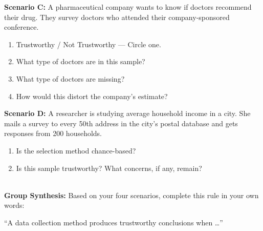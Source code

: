 \documentclass[10pt]{article}
\begin{document}
\vspace{0.1in}

\textbf{Scenario C:} A pharmaceutical company wants to know if doctors recommend their
drug. They survey doctors who attended their company-sponsored conference.

\begin{practicebox}
\small
\begin{enumerate}[leftmargin=1.5em, itemsep=8pt]
  \item Trustworthy \quad / \quad Not Trustworthy --- Circle one.
  \item What type of doctors are in this sample? \blank{8cm}
  \item What type of doctors are missing? \blank{8cm}
  \item How would this distort the company's estimate? \blank{8cm}
\end{enumerate}
\end{practicebox}

\vspace{0.1in}

\textbf{Scenario D:} A researcher is studying average household income in a city.
She mails a survey to every 50th address in the city's postal database and
gets responses from 200 households.

\begin{practicebox}
\small
\begin{enumerate}[leftmargin=1.5em, itemsep=8pt]
  \item Is the selection method chance-based? \blank{5cm}
  \item Is this sample trustworthy? What concerns, if any, remain?\\
        \writeline\\[1pt]\writeline
\end{enumerate}
\end{practicebox}

\vspace{0.12in}

\begin{practicebox}
\small
\textbf{Group Synthesis:} Based on your four scenarios, complete this rule in your
own words:

\vspace{6pt}
``A data collection method produces trustworthy conclusions when \ldots''\\[6pt]
\writeline\\[1pt]\writeline\\[1pt]\writeline
\end{practicebox}
\end{document}

